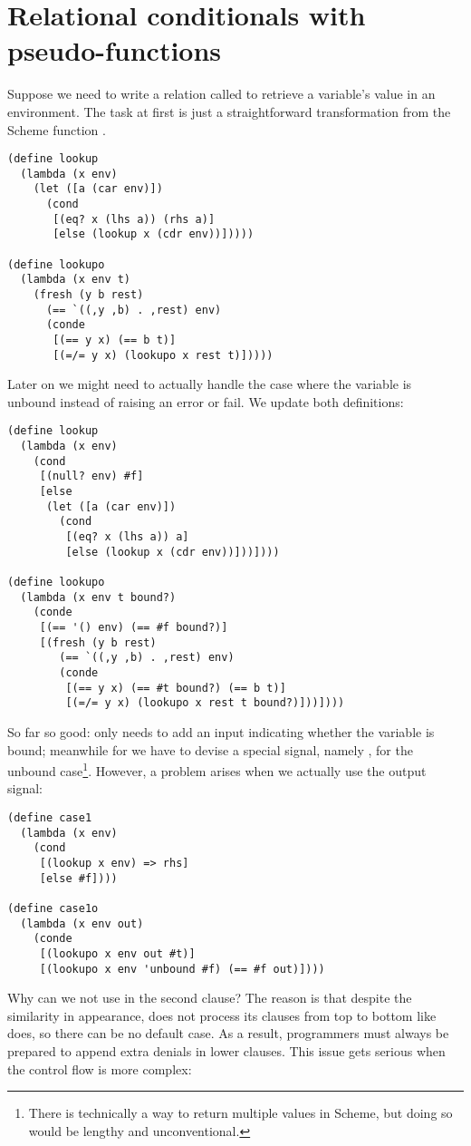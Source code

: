 \section{Relational conditionals with pseudo-functions}\label{reif}
Suppose we need to write a relation called  to retrieve a variable's value in an environment. The task at first is just a straightforward transformation from the Scheme function .
\begin{lstlisting}
(define lookup
  (lambda (x env)
    (let ([a (car env)])
      (cond
       [(eq? x (lhs a)) (rhs a)]
       [else (lookup x (cdr env))]))))

(define lookupo
  (lambda (x env t)
    (fresh (y b rest)
      (== `((,y ,b) . ,rest) env)
      (conde
       [(== y x) (== b t)]
       [(=/= y x) (lookupo x rest t)]))))
\end{lstlisting}

Later on we might need to actually handle the case where the variable is unbound instead of raising an error or fail. We update both definitions:
\begin{lstlisting}
(define lookup
  (lambda (x env)
    (cond
     [(null? env) #f]
     [else
      (let ([a (car env)])
        (cond
         [(eq? x (lhs a)) a]
         [else (lookup x (cdr env))]))])))

(define lookupo
  (lambda (x env t bound?)
    (conde
     [(== '() env) (== #f bound?)]
     [(fresh (y b rest)
        (== `((,y ,b) . ,rest) env)
        (conde
         [(== y x) (== #t bound?) (== b t)]
         [(=/= y x) (lookupo x rest t bound?)]))])))
\end{lstlisting}

So far so good:  only needs to add an input indicating whether the variable is bound; meanwhile for  we have to devise a special signal, namely , for the unbound case\footnote{There is technically a way to return multiple values in Scheme, but doing so would be lengthy and unconventional.}. However, a problem arises when we actually use the output signal:
\begin{lstlisting}
(define case1
  (lambda (x env)
    (cond
     [(lookup x env) => rhs]
     [else #f])))

(define case1o
  (lambda (x env out)
    (conde
     [(lookupo x env out #t)]
     [(lookupo x env 'unbound #f) (== #f out)])))
\end{lstlisting}

Why can we not use  in the second clause? The reason is that despite the similarity in appearance,  does not process its clauses from top to bottom like  does, so there can be no default case. As a result, programmers must always be prepared to append extra denials in lower  clauses. This issue gets serious when the control flow is more complex:


